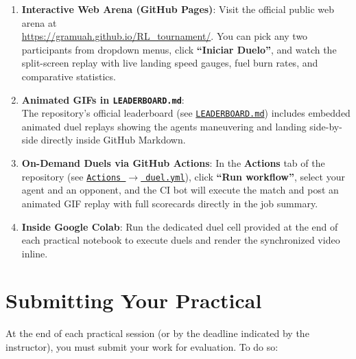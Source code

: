 \documentclass[11pt,a4paper]{article}
\begin{document}
\begin{enumerate}
    \item \textbf{Interactive Web Arena (GitHub Pages)}: Visit the official public web arena at \\ \url{https://gramuah.github.io/RL_tournament/}. You can pick any two participants from dropdown menus, click \textbf{``Iniciar Duelo''}, and watch the split-screen replay with live landing speed gauges, fuel burn rates, and comparative statistics.
    \item \textbf{Animated GIFs in \texttt{LEADERBOARD.md}}:\\ The repository's official leaderboard (see \href{https://github.com/gramuah/RL_tournament/blob/main/LEADERBOARD.md}{\texttt{LEADERBOARD.md}}) includes embedded animated duel replays showing the agents maneuvering and landing side-by-side directly inside GitHub Markdown.
    \item \textbf{On-Demand Duels via GitHub Actions}: In the \textbf{Actions} tab of the repository (see \href{https://github.com/gramuah/RL_tournament/actions/workflows/duel.yml}{\texttt{Actions $\rightarrow$ duel.yml}}), click \textbf{``Run workflow''}, select your agent and an opponent, and the CI bot will execute the match and post an animated GIF replay with full scorecards directly in the job summary.
    \item \textbf{Inside Google Colab}: Run the dedicated duel cell provided at the end of each practical notebook to execute duels and render the synchronized video inline.
\end{enumerate}

\section{Submitting Your Practical}
\label{sec:submitting}

At the end of each practical session (or by the deadline indicated by the instructor), you must submit your work for evaluation. To do so:
\end{document}
